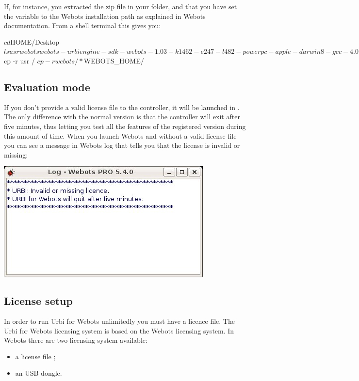 If, for instance, you extracted the zip file in your 
folder, and that you have set the variable  to the
Webots installation path as explained in Webots documentation.  From a
shell terminal this gives you:

\begin{shell}
$ cd $HOME/Desktop
$ ls
usr webots
webots-urbiengine-sdk-webots-1.03-k1462-e247-l482-powerpc-apple-darwin8-gcc-4.0.1.zip
$ cp -r usr /
$ cp -r webots/* $WEBOTS_HOME/
\end{shell}

\subsection{Evaluation mode}

If you don't provide a valid license file to the \urbi controller, it
will be launched in . The only difference with
the normal version is that the controller will exit after five
minutes, thus letting you test all the features of the registered
version during this amount of time. When you launch Webots and \urbi
without a valid license file you can see a message in Webots log that
tells you that the license is invalid or missing:

\begin{center}
  \includegraphics{img/webots/no-license-webots-log-msg}
\end{center}


\subsection{License setup}

In order to run Urbi for Webots unlimitedly you must have a licence
file.  The Urbi for Webots licensing system is based on the Webots
licensing system.  In Webots there are two licensing system available:
\begin{itemize}
\item a license file ;
\item an USB dongle.
\end{itemize}

